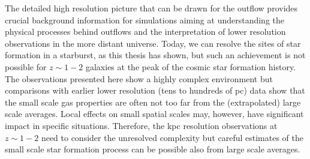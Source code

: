 \vspace{\baselineskip}

The detailed high resolution picture that can be drawn for the  outflow provides crucial background information for simulations aiming at understanding the physical processes behind outflows and the interpretation of lower resolution observations in the more distant universe.
Today, we can resolve the sites of star formation in a starburst, as this thesis has shown, but such an achievement is not possible for $z\sim1-2$ galaxies at the peak of the cosmic star formation history.
The observations presented here show a highly complex environment but comparisons with earlier lower resolution (tens to hundreds of pc) data show that the small scale gas properties are often not too far from the (extrapolated) large scale averages. Local effects on small spatial scales may, however, have significant impact in specific situations.
Therefore, the kpc resolution observations at $z\sim1-2$ need to consider the unresolved complexity but careful estimates of the small scale star formation process can be possible also from large scale averages.
